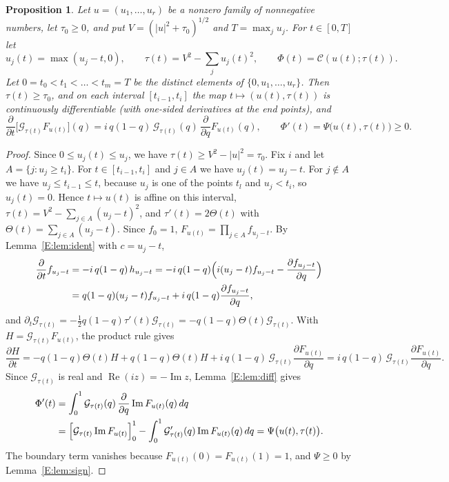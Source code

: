 \documentclass[11pt]{amsart}
\newtheorem{proposition}[theorem]{Proposition}
\theoremstyle{remark}
\numberwithin{equation}{section}
\begin{document}
\begin{proposition}\label{E:prop:transport}
Let $u=(u_1,\dots,u_r)$ be a nonzero family of nonnegative numbers, let $\tau_0\ge0$, and put $V=(|u|^2+\tau_0)^{1/2}$ and $T=\max_ju_j$. For $t\in[0,T]$ let
\[
u_j(t)=\max(u_j-t,0),\qquad \tau(t)=V^2-\sum_ju_j(t)^2,\qquad \Phi(t)=\mathcal C(u(t);\tau(t)).
\]
Let $0=t_0<t_1<\dots<t_m=T$ be the distinct elements of $\{0,u_1,\dots,u_r\}$. Then $\tau(t)\ge\tau_0$, and on each interval $[t_{i-1},t_i]$ the map $t\mapsto(u(t),\tau(t))$ is continuously differentiable (with one-sided derivatives at the end points), and
\[
\frac{\partial}{\partial t}\bigl[\mathcal G_{\tau(t)}F_{u(t)}\bigr](q)=i\,q(1-q)\,\mathcal G_{\tau(t)}(q)\,\frac{\partial}{\partial q}F_{u(t)}(q),\qquad \Phi'(t)=\Psi\bigl(u(t),\tau(t)\bigr)\ge0.
\]
\end{proposition}

\begin{proof}
Since $0\le u_j(t)\le u_j$, we have $\tau(t)\ge V^2-|u|^2=\tau_0$. Fix $i$ and let $A=\{j:u_j\ge t_i\}$. For $t\in[t_{i-1},t_i]$ and $j\in A$ we have $u_j(t)=u_j-t$. For $j\notin A$ we have $u_j\le t_{i-1}\le t$, because $u_j$ is one of the points $t_l$ and $u_j<t_i$, so $u_j(t)=0$. Hence $t\mapsto u(t)$ is affine on this interval, $\tau(t)=V^2-\sum_{j\in A}(u_j-t)^2$, and $\tau'(t)=2\Theta(t)$ with $\Theta(t)=\sum_{j\in A}(u_j-t)$. Since $f_0=1$, $F_{u(t)}=\prod_{j\in A}f_{u_j-t}$. By Lemma~\ref{E:lem:ident} with $c=u_j-t$,
\[
\begin{aligned}
\frac{\partial}{\partial t}f_{u_j-t}&=-i\,q(1-q)\,h_{u_j-t}=-i\,q(1-q)\Bigl(i(u_j-t)f_{u_j-t}-\frac{\partial f_{u_j-t}}{\partial q}\Bigr)\\
&=q(1-q)(u_j-t)f_{u_j-t}+i\,q(1-q)\frac{\partial f_{u_j-t}}{\partial q},
\end{aligned}
\]
and $\partial_t\mathcal G_{\tau(t)}=-\frac12q(1-q)\tau'(t)\mathcal G_{\tau(t)}=-q(1-q)\Theta(t)\mathcal G_{\tau(t)}$. With $H=\mathcal G_{\tau(t)}F_{u(t)}$, the product rule gives
\[
\frac{\partial H}{\partial t}=-q(1-q)\Theta(t)H+q(1-q)\Theta(t)H+i\,q(1-q)\,\mathcal G_{\tau(t)}\frac{\partial F_{u(t)}}{\partial q}=i\,q(1-q)\,\mathcal G_{\tau(t)}\frac{\partial F_{u(t)}}{\partial q}.
\]
Since $\mathcal G_{\tau(t)}$ is real and $\operatorname{Re}(iz)=-\operatorname{Im}z$, Lemma~\ref{E:lem:diff} gives
\[
\begin{aligned}
\Phi'(t)&=\int_0^1\mathcal G_{\tau(t)}(q)\,\frac{\partial}{\partial q}\operatorname{Im}F_{u(t)}(q)\,dq\\
&=\Bigl[\mathcal G_{\tau(t)}\operatorname{Im}F_{u(t)}\Bigr]_0^1-\int_0^1\mathcal G_{\tau(t)}'(q)\operatorname{Im}F_{u(t)}(q)\,dq=\Psi\bigl(u(t),\tau(t)\bigr).
\end{aligned}
\]
The boundary term vanishes because $F_{u(t)}(0)=F_{u(t)}(1)=1$, and $\Psi\ge0$ by Lemma~\ref{E:lem:sign}.
\end{proof}
\end{document}
